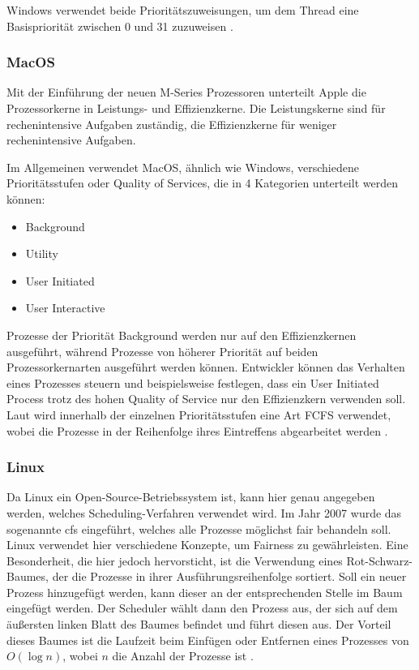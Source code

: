 Windows verwendet beide Prioritätszuweisungen, um dem Thread eine Basispriorität zwischen 0 und 31 zuzuweisen \autocite{KarlBridgeMicrosoft.2023}.

\subsubsection{MacOS}
Mit der Einführung der neuen M-Series Prozessoren unterteilt Apple die Prozessorkerne in Leistungs- und Effizienzkerne. Die Leistungskerne sind für rechenintensive Aufgaben zuständig, die Effizienzkerne für weniger rechenintensive Aufgaben. \autocite{hoakley.2022}

Im Allgemeinen verwendet MacOS, ähnlich wie Windows, verschiedene Prioritätsstufen oder Quality of Services, die in 4 Kategorien unterteilt werden können:
\begin{multicols}{2}
    \begin{itemize}[noitemsep]
        \item Background
        \item Utility
        \item User Initiated
        \item User Interactive
    \end{itemize}
\end{multicols}
Prozesse der Priorität Background werden nur auf den Effizienzkernen ausgeführt, während Prozesse von höherer Priorität auf beiden Prozessorkernarten ausgeführt werden können.
Entwickler können das Verhalten eines Prozesses steuern und beispielsweise festlegen, dass ein User Initiated Process trotz des hohen Quality of Service nur den Effizienzkern verwenden soll.
Laut  wird innerhalb der einzelnen Prioritätsstufen eine Art \ac{FCFS} verwendet, wobei die Prozesse in der Reihenfolge ihres Eintreffens abgearbeitet werden \autocite{hoakley.2022b}.

\subsubsection{Linux}
Da Linux ein Open-Source-Betriebssystem ist, kann hier genau angegeben werden, welches Scheduling-Verfahren verwendet wird. Im Jahr 2007 wurde das sogenannte \ac{cfs} eingeführt, welches alle Prozesse möglichst fair behandeln soll.
Linux verwendet hier verschiedene Konzepte, um Fairness zu gewährleisten.
Eine Besonderheit, die hier jedoch hervorsticht, ist die Verwendung eines Rot-Schwarz-Baumes, der die Prozesse in ihrer Ausführungsreihenfolge sortiert.
Soll ein neuer Prozess hinzugefügt werden, kann dieser an der entsprechenden Stelle im Baum eingefügt werden.
Der Scheduler wählt dann den Prozess aus, der sich auf dem äußersten linken Blatt des Baumes befindet und führt diesen aus.
Der Vorteil dieses Baumes ist die Laufzeit beim Einfügen oder Entfernen eines Prozesses von $O(\log n)$, wobei $n$ die Anzahl der Prozesse ist \autocite{Jones.2009}.

